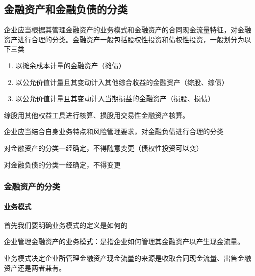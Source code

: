 \documentclass[UTF8,12pt]{ctexart}
\numberwithin{equation}{section} %
\numberwithin{figure}{section}
\numberwithin{table}{section}
\begin{document}
	\subsection{金融资产和金融负债的分类}
	企业应当根据其管理金融资产的业务模式和金融资产的合同现金流量特征，对金融资产进行合理的分类。金融资产一般包括股权性投资和债权性投资，一般划分为以下三类
	\begin{enumerate}
		\item 以摊余成本计量的金融资产（摊债）
		
		\item 以公允价值计量且其变动计入其他综合收益的金融资产（综股、综债）
		
		\item 以公允价值计量且其变动计入当期损益的金融资产（损股、损债）
	\end{enumerate}

	综股用其他权益工具进行核算、损股用交易性金融资产核算。
	
	企业应当结合自身业务特点和风险管理要求，对金融负债进行合理的分类
	
	对金融资产的分类一经确定，不得随意变更（债权性投资可以变）
	
	对金融负债的分类一经确定，不得变更
	\subsubsection{金融资产的分类}
	\paragraph{业务模式}首先我们要明确业务模式的定义是如何的
	
	企业管理金融资产的业务模式：是指企业如何管理其金融资产以产生现金流量。
	
	业务模式决定企业所管理金融资产现金流量的来源是收取合同现金流量、出售金融资产还是两者兼有。
	
\end{document}
